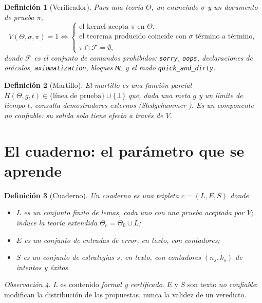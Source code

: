 \documentclass[11pt]{article}
\newtheorem{definition}{Definición}[section]
\theoremstyle{remark}
\newtheorem{remark}[definition]{Observación}
\newcommand{\F}{\mathcal{F}}
\newcommand{\1}{\mathbb{1}}
\begin{document}
\begin{definition}[Verificador]
Para una teoría $\Theta$, un enunciado $\sigma$ y un documento de prueba $\pi$,
\[
V(\Theta,\sigma,\pi)=1 \iff
\begin{cases}
\text{el kernel acepta } \pi \text{ en } \Theta,\\
\text{el teorema producido coincide con } \sigma \text{ término a término},\\
\pi\cap\F=\emptyset,
\end{cases}
\]
donde $\F$ es el conjunto de comandos prohibidos: \texttt{sorry}, \texttt{oops}, declaraciones de oráculos, \texttt{axiomatization}, bloques \texttt{ML} y el modo \texttt{quick\_and\_dirty}.
\end{definition}

\begin{definition}[Martillo]
El martillo es una función parcial $H(\Theta,g,t)\in\{\text{línea de prueba}\}\cup\{\bot\}$ que, dada una meta $g$ y un límite de tiempo $t$, consulta demostradores externos (Sledgehammer \cite{paulson2010}). Es un componente \emph{no confiable}: su salida solo tiene efecto a través de $V$.
\end{definition}

\section{El cuaderno: el parámetro que se aprende}

\begin{definition}[Cuaderno]
Un cuaderno es una tripleta $c=(L,E,S)$ donde
\begin{itemize}[nosep]
\item $L$ es un conjunto finito de lemas, cada uno con una prueba aceptada por $V$; induce la teoría extendida $\Theta_c=\Theta_0\cup L$;
\item $E$ es un conjunto de entradas de error, en texto, con contadores;
\item $S$ es un conjunto de estrategias $s$, en texto, con contadores $(n_s,k_s)$ de intentos y éxitos.
\end{itemize}
\end{definition}

\begin{remark}
$L$ es contenido \emph{formal y certificado}. $E$ y $S$ son texto \emph{no confiable}: modifican la distribución de las propuestas, nunca la validez de un veredicto.
\end{remark}
\end{document}
